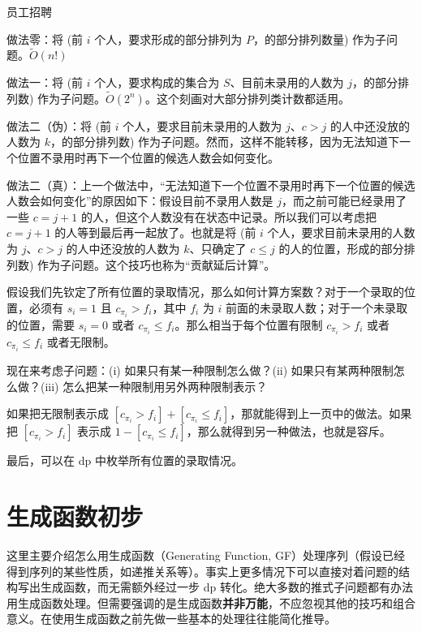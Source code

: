     \begin{example}
        [CSP-S 2025] 员工招聘
    \end{example}
    \begin{solution}
        做法零：将 (前 $i$ 个人，要求形成的部分排列为 $P$，的部分排列数量) 作为子问题。$\tilde O(n!)$

    做法一：将 (前 $i$ 个人，要求构成的集合为 $S$、目前未录用的人数为 $j$，的部分排列数) 作为子问题。$\tilde O(2^n)$。这个刻画对大部分排列类计数都适用。

    做法二（伪）：将 (前 $i$ 个人，要求目前未录用的人数为 $j$、$c>j$ 的人中还没放的人数为 $k$，的部分排列数) 作为子问题。然而，这样不能转移，因为无法知道下一个位置不录用时再下一个位置的候选人数会如何变化。

    做法二（真）：上一个做法中，“无法知道下一个位置不录用时再下一个位置的候选人数会如何变化”的原因如下：假设目前不录用人数是 $j$，而之前可能已经录用了一些 $c=j+1$ 的人，但这个人数没有在状态中记录。所以我们可以考虑把 $c=j+1$ 的人等到最后再一起放了。也就是将 (前 $i$ 个人，要求目前未录用的人数为 $j$、$c>j$ 的人中还没放的人数为 $k$、只确定了 $c\le j$ 的人的位置，形成的部分排列数) 作为子问题。这个技巧也称为“贡献延后计算”。
    \end{solution}
    \begin{solution}[另一个视角]
            假设我们先钦定了所有位置的录取情况，那么如何计算方案数？对于一个录取的位置，必须有 $s_i=1$ 且 $c_{\pi_i}>f_i$，其中 $f_i$ 为 $i$ 前面的未录取人数；对于一个未录取的位置，需要 $s_i=0$ 或者 $c_{\pi_i}\le f_i$。那么相当于每个位置有限制 $c_{\pi_i}>f_i$ 或者 $c_{\pi_i}\le f_i$ 或者无限制。

    现在来考虑子问题：(i) 如果只有某一种限制怎么做？(ii) 如果只有某两种限制怎么做？(iii) 怎么把某一种限制用另外两种限制表示？

    如果把无限制表示成 $[c_{\pi_i}>f_i]+[c_{\pi_i}\le f_i]$，那就能得到上一页中的做法。如果把 $[c_{\pi_i}>f_i]$ 表示成 $1-[c_{\pi_i}\le f_i]$，那么就得到另一种做法，也就是容斥。

    最后，可以在 dp 中枚举所有位置的录取情况。    
    \end{solution}

\section{生成函数初步}
    这里主要介绍怎么用生成函数（Generating Function, GF）处理序列（假设已经得到序列的某些性质，如递推关系等）。事实上更多情况下可以直接对着问题的结构写出生成函数，而无需额外经过一步 dp 转化。绝大多数的推式子问题都有办法用生成函数处理。但需要强调的是生成函数\textbf{并非万能}，不应忽视其他的技巧和组合意义。在使用生成函数之前先做一些基本的处理往往能简化推导。

